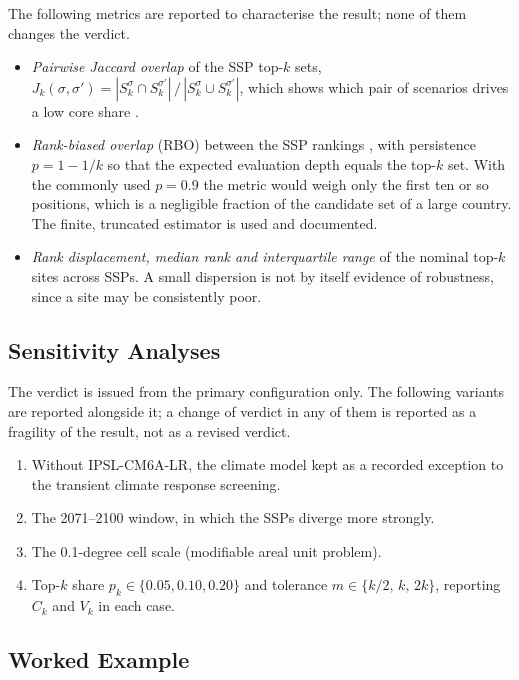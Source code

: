 The following metrics are reported to characterise the result; none of them
changes the verdict.
\begin{itemize}
    \item \textit{Pairwise Jaccard overlap} of the SSP top-$k$ sets,
    $J_k(\sigma,\sigma')=|S^{\sigma}_{k}\cap S^{\sigma'}_{k}|\,/\,
    |S^{\sigma}_{k}\cup S^{\sigma'}_{k}|$, which shows which pair of scenarios
    drives a low core share \cite{fagin2003}.
    \item \textit{Rank-biased overlap} (RBO) between the SSP rankings
    \cite{webber2010}, with persistence $p=1-1/k$ so that the expected
    evaluation depth equals the top-$k$ set. With the commonly used
    $p=0.9$ the metric would weigh only the first ten or so positions, which is
    a negligible fraction of the candidate set of a large country. The finite,
    truncated estimator is used and documented.
    \item \textit{Rank displacement, median rank and interquartile range} of the
    nominal top-$k$ sites across SSPs. A small dispersion is not by itself
    evidence of robustness, since a site may be consistently poor.
\end{itemize}

\subsection{Sensitivity Analyses}
\label{subsec:h1_sensitivity}

The verdict is issued from the primary configuration only. The following
variants are reported alongside it; a change of verdict in any of them is
reported as a fragility of the result, not as a revised verdict.
\begin{enumerate}
    \item Without IPSL-CM6A-LR, the climate model kept as a recorded exception
    to the transient climate response screening.
    \item The 2071--2100 window, in which the SSPs diverge more strongly.
    \item The 0.1-degree cell scale (modifiable areal unit problem).
    \item Top-$k$ share $p_k\in\{0.05,0.10,0.20\}$ and tolerance
    $m\in\{k/2,\,k,\,2k\}$, reporting $C_k$ and $V_k$ in each case.
\end{enumerate}

\subsection{Worked Example}
\label{subsec:h1_example}

